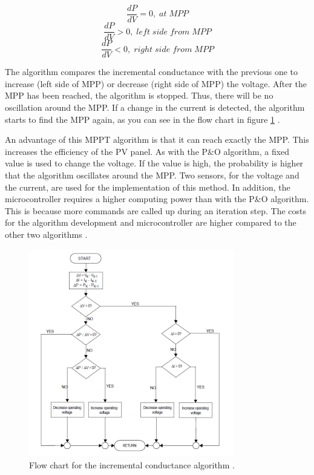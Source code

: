 \begin{equation} \label{Inccond1}
\frac{dP}{dV} = 0 ,\; at\; MPP 
\end{equation} 
\begin{equation} \label{Inccond2}
\frac{dP}{dV} > 0 ,\; left\; side\; from\; MPP 
\end{equation}
\begin{equation} \label{Inccond3}
\frac{dP}{dV} < 0 ,\; right\; side\; from\; MPP
\end{equation}

The algorithm compares the incremental conductance with the previous one to increase (left side of MPP) or decrease (right side of MPP) the voltage. After the MPP has been reached, the algorithm is stopped. Thus, there will be no oscillation around the MPP. If a change in the current is detected, the algorithm starts to find the MPP again, as you can see in the flow chart in figure \ref{fcinccon} \cite{AN1521_MC}.

An advantage of this MPPT algorithm is that it can reach exactly the MPP. This increases the efficiency of the PV panel. As with the P\&O algorithm, a fixed value is used to change the voltage. If the value is high, the probability is higher that the algorithm oscillates around the MPP. 
Two sensors, for the voltage and the current, are used for the implementation of this method. In addition, the microcontroller requires a higher computing power than with the P\&O algorithm. This is because more commands are called up during an iteration step. The costs for the algorithm development and microcontroller are higher compared to the other two algorithms \cite{AN1521_MC}.

\begin{figure}[H]
	\begin{center}
		\includegraphics[width=0.8\textwidth]{../Pictures/P1/Flow_chart/flow_chart_incremental_conductance}
		\caption{Flow chart for the incremental conductance algorithm \cite{AN1521_MC}.}
		\label{fcinccon}
	\end{center}	
\end{figure}


